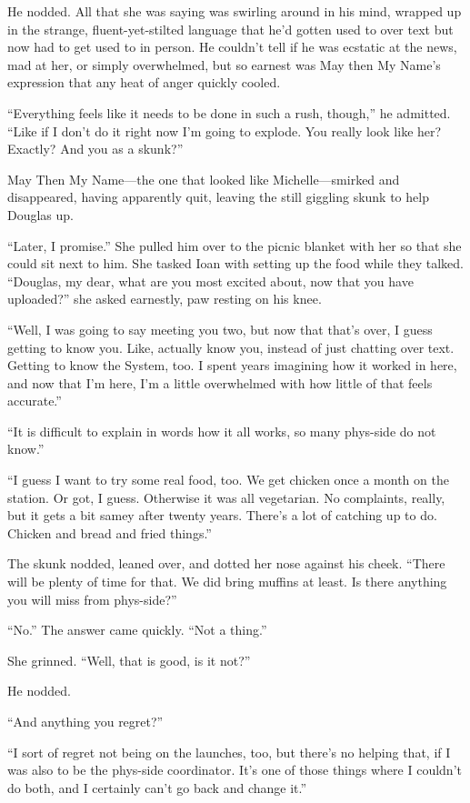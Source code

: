He nodded. All that she was saying was swirling around in his mind, wrapped up in the strange, fluent-yet-stilted language that he'd gotten used to over text but now had to get used to in person. He couldn't tell if he was ecstatic at the news, mad at her, or simply overwhelmed, but so earnest was May then My Name's expression that any heat of anger quickly cooled.

``Everything feels like it needs to be done in such a rush, though,'' he admitted. ``Like if I don't do it right now I'm going to explode. You really look like her? Exactly? And you as a skunk?''

May Then My Name---the one that looked like Michelle---smirked and disappeared, having apparently quit, leaving the still giggling skunk to help Douglas up.

``Later, I promise.'' She pulled him over to the picnic blanket with her so that she could sit next to him. She tasked Ioan with setting up the food while they talked. ``Douglas, my dear, what are you most excited about, now that you have uploaded?'' she asked earnestly, paw resting on his knee.

``Well, I was going to say meeting you two, but now that that's over, I guess getting to know you. Like, actually know you, instead of just chatting over text. Getting to know the System, too. I spent years imagining how it worked in here, and now that I'm here, I'm a little overwhelmed with how little of that feels accurate.''

``It is difficult to explain in words how it all works, so many phys-side do not know.''

``I guess I want to try some real food, too. We get chicken once a month on the station. Or got, I guess. Otherwise it was all vegetarian. No complaints, really, but it gets a bit samey after twenty years. There's a lot of catching up to do. Chicken and bread and fried things.''

The skunk nodded, leaned over, and dotted her nose against his cheek. ``There will be plenty of time for that. We did bring muffins at least. Is there anything you will miss from phys-side?''

``No.'' The answer came quickly. ``Not a thing.''

She grinned. ``Well, that is good, is it not?''

He nodded.

``And anything you regret?''

``I sort of regret not being on the launches, too, but there's no helping that, if I was also to be the phys-side coordinator. It's one of those things where I couldn't do both, and I certainly can't go back and change it.''


